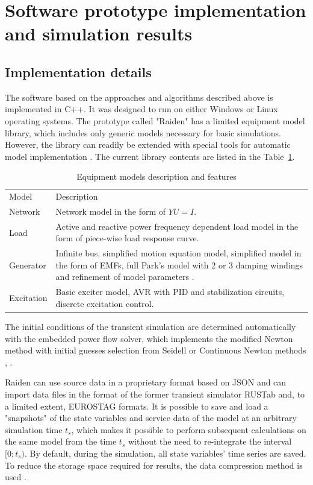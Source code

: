\documentclass[lettersize,journal]{IEEEtran}
\begin{document}
\section {Software prototype implementation and simulation results}
\subsection {Implementation details}

The software based on the approaches and algorithms described above is implemented in C++. It was designed to run on either Windows or Linux operating systems. The prototype called "Raiden" has a limited equipment model library, which includes only generic models necessary for basic simulations. However, the library can readily be extended with special tools for automatic model implementation \cite{mycompiler}. The current library contents are listed in the Table~\ref{tab:models}.

\begin{table}[!h]
	\caption{Equipment models description and features \label{tab:models}}
	\centering
	\setlength\extrarowheight{1pt}
	\begin{tabularx}{\columnwidth}{|l|X|}
		\hline
		Model & Description \\
		\hlineB{3}	
		Network & Network model in the form of \(YU=I\).  \\
		\hline
		Load & Active and reactive power frequency dependent load model in the form of piece-wise load response curve.\\
		\hline
		Generator & Infinite bus, simplified motion equation model, simplified model in the form of EMFs, full Park's model with 2 or 3 damping windings and refinement of model parameters \cite{Canay93}. \\
		\hline
		Excitation & Basic exciter model, AVR with PID and stabilization circuits, discrete excitation control.\\
		\hline
	\end{tabularx}
\end{table}

The initial conditions of the transient simulation are determined automatically with the embedded power flow solver, which implements the modified Newton method with initial guesses selection from Seidell or Continuous Newton methods \cite{MilanoRK09}, \cite{TostadoVliz2021}.

Raiden can use source data in a proprietary format based on JSON and can import data files in the format of the former transient simulator RUSTab and, to a limited extent, EUROSTAG formats. It is possible to save and load a "snapshots" of the state variables and service data of the model at an arbitrary simulation time \(t_s\), which makes it possible to perform subsequent calculations on the same model from the time \(t_s\) without the need to re-integrate the interval \([0;t_s)\). By default, during the simulation, all state variables' time series are saved. To reduce the storage space required for results, the data compression method is used \cite{mycompression}.
\end{document}
